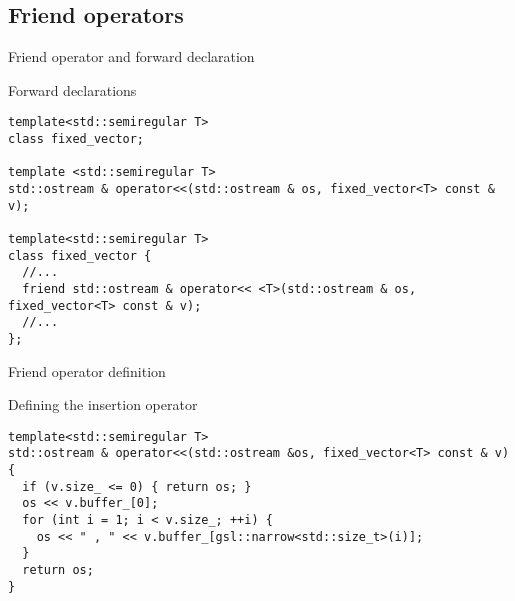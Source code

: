 \subsection{Friend operators}

\begin{frame}[t,fragile]{Friend operator and forward declaration}

\begin{block}{Forward declarations}
\begin{lstlisting}[escapechar=@]
template<std::semiregular T>
class fixed_vector;

template <std::semiregular T>
std::ostream & operator<<(std::ostream & os, fixed_vector<T> const & v);

template<std::semiregular T>
class fixed_vector {
  //...
  friend std::ostream & operator<< <T>(std::ostream & os, fixed_vector<T> const & v);
  //...
};
\end{lstlisting}
\end{block}

\end{frame}

\begin{frame}[t,fragile]{Friend operator definition}
\begin{block}{Defining the insertion operator}
\begin{lstlisting}
template<std::semiregular T>
std::ostream & operator<<(std::ostream &os, fixed_vector<T> const & v) {
  if (v.size_ <= 0) { return os; }
  os << v.buffer_[0];
  for (int i = 1; i < v.size_; ++i) {
    os << " , " << v.buffer_[gsl::narrow<std::size_t>(i)];
  }
  return os;
}
\end{lstlisting}
\end{block}
\end{frame}

